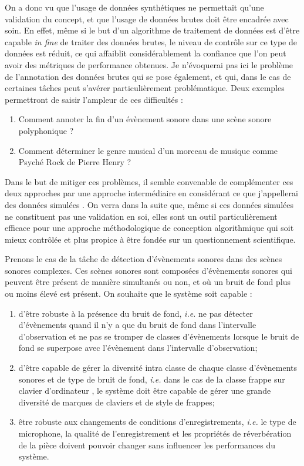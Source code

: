 On a donc vu que l'usage de données synthétiques ne permettait qu'une validation du concept, et que l'usage de données brutes doit être encadrée avec soin. En effet, même si le but d'un algorithme de traitement de données est d'être capable \textit{in fine} de traiter des données brutes, le niveau de contrôle sur ce type de données est réduit, ce qui affaiblit considérablement la confiance que l'on peut avoir des métriques de performance obtenues. Je n'évoquerai pas ici le problème de l'annotation des données brutes qui se pose également, et qui, dans le cas de certaines tâches peut s'avérer particulièrement problématique. Deux exemples permettront de saisir l'ampleur de ces difficultés :
\begin{enumerate}
  \item Comment annoter la fin d'un évènement sonore dans une scène sonore polyphonique ?
  \item  Comment déterminer le genre musical d'un morceau de musique comme \og Psyché Rock \fg de Pierre Henry ?
\end{enumerate}

Dans le but de mitiger ces problèmes, il semble convenable de complémenter ces deux approches par une approche intermédiaire en considérant ce que j'appellerai des données \og simulées \fg. On verra dans la suite que, même si ces données simulées ne constituent pas une validation en soi, elles sont un outil particulièrement efficace pour une approche méthodologique de conception algorithmique qui soit mieux contrôlée et plus propice à être fondée sur un questionnement scientifique.

Prenons le cas de la tâche de détection d'évènements sonores dans des scènes sonores complexes. Ces scènes sonores sont composées d'évènements sonores qui peuvent être présent de manière simultanés ou non, et où un bruit de fond plus ou moins élevé est présent. On souhaite que le système soit capable :
\begin{enumerate}
  \item d'être robuste à la présence du bruit de fond, \textit{i.e.} ne pas détecter d'évènements quand il n'y a que du bruit de fond dans l'intervalle d'observation et ne pas se tromper de classes d'évènements lorsque le bruit de fond se superpose avec l'évènement  dans l'intervalle d'observation;
  \item d'être capable de gérer la diversité intra classe de chaque classe d'évènements sonores et de type de bruit de fond,  \textit{i.e.} dans le cas de la classe \og frappe sur clavier d'ordinateur \fg, le système doit être capable de gérer une grande diversité de marques de claviers et de style de frappes;
  \item être robuste aux changements de conditions d'enregistrements,  \textit{i.e.} le type de microphone, la qualité de l'enregistrement et les propriétés de réverbération de la pièce doivent pouvoir changer sans influencer les performances du système.
\end{enumerate}

